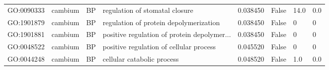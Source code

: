 \begin{longtable}{llllrl}
GO:0090333 & cambium & BP &   regulation of stomatal closure  & 0.038450 &   False  & 14.0 & 0.0 \\ 
GO:1901879 & cambium & BP &   regulation of protein depolymerization  & 0.038450 &   False  & 0 & 0 \\
GO:1901881 & cambium & BP &   positive regulation of protein depolymer...  & 0.038450 &   False  & 0 & 0 \\
GO:0048522 & cambium & BP &   positive regulation of cellular process  & 0.045520 &   False  & 0 & 0 \\
GO:0044248 & cambium & BP &   cellular catabolic process  & 0.048520 &   False  & 1.0 & 0.0 \\ 
\bottomrule
\end{longtable}

